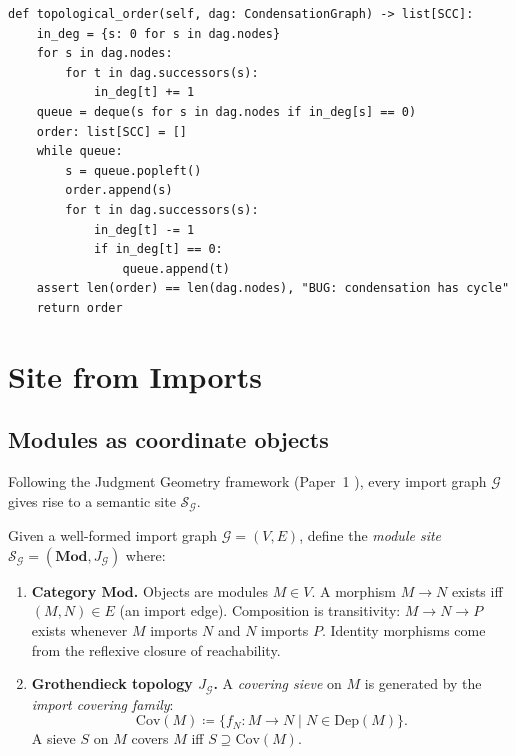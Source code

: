 \documentclass[11pt]{article}
\newcommand{\IG}{\mathcal{G}}              %
\newcommand{\DA}{\textsc{DepAnalyzer}}     %
\newcommand{\MdCat}{\mathbf{Mod}}          %
\newcommand{\Dep}{\mathrm{Dep}}            %
\newcommand{\ModSite}{\mathcal{S}_{\IG}}   %
\begin{document}
\begin{lstlisting}[style=jugeo-python,
  caption={Kahn's algorithm for topological order in \DA.},
  label={lst:kahn}]
def topological_order(self, dag: CondensationGraph) -> list[SCC]:
    in_deg = {s: 0 for s in dag.nodes}
    for s in dag.nodes:
        for t in dag.successors(s):
            in_deg[t] += 1
    queue = deque(s for s in dag.nodes if in_deg[s] == 0)
    order: list[SCC] = []
    while queue:
        s = queue.popleft()
        order.append(s)
        for t in dag.successors(s):
            in_deg[t] -= 1
            if in_deg[t] == 0:
                queue.append(t)
    assert len(order) == len(dag.nodes), "BUG: condensation has cycle"
    return order
\end{lstlisting}

\section{Site from Imports}
\label{sec:site}

\subsection{Modules as coordinate objects}

Following the Judgment Geometry framework (Paper~1 \cite{paper01}),
every import graph $\IG$ gives rise to a semantic site $\ModSite$.

\begin{construction}
\label{constr:module-site}
Given a well-formed import graph $\IG = (V, E)$, define the
\emph{module site} $\ModSite = (\MdCat, J_{\IG})$ where:
\begin{enumerate}[label=(\alph*)]
  \item \textbf{Category $\MdCat$.}
        Objects are modules $M \in V$.  A morphism $M \to N$ exists
        iff $(M, N) \in E$ (an import edge).  Composition is
        transitivity: $M \to N \to P$ exists whenever $M$ imports $N$
        and $N$ imports $P$.  Identity morphisms come from the
        reflexive closure of reachability.

  \item \textbf{Grothendieck topology $J_{\IG}$.}
        A \emph{covering sieve} on $M$ is generated by the
        \emph{import covering family}:
        \[
          \mathrm{Cov}(M) \coloneqq
          \bigl\{f_N \colon M \to N \;\big|\; N \in \Dep(M)\bigr\}.
        \]
        A sieve $S$ on $M$ covers $M$ iff
        $S \supseteq \mathrm{Cov}(M)$.
\end{enumerate}
\end{construction}
\end{document}
